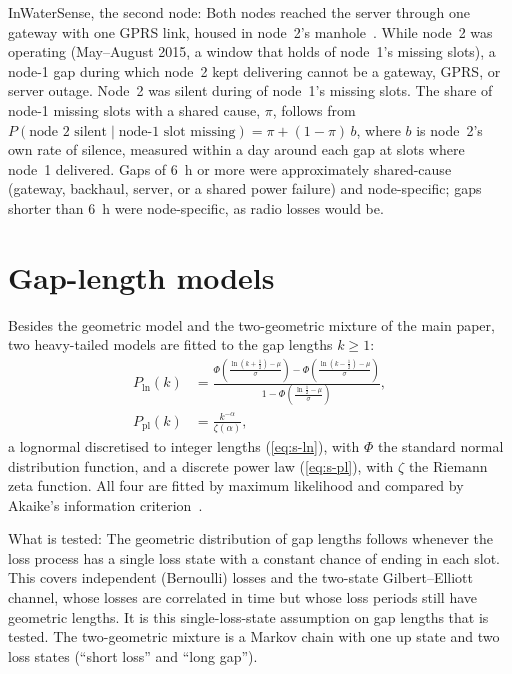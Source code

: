 \documentclass[journal]{IEEEtran}
\begin{document}
InWaterSense, the second node: Both nodes reached the server through one gateway with one GPRS link, housed in node~2's manhole~\cite{ahmedi2022dataset}. While node~2 was operating (May--August 2015, a window that holds \inwsWindowShare{} of node~1's missing slots), a node-1 gap during which node~2 kept delivering cannot be a gateway, GPRS, or server outage. Node~2 was silent during \inwsNodeTwoSilent{} of node~1's missing slots. The share of node-1 missing slots with a shared cause, $\pi$, follows from $P(\text{node 2 silent}\mid\text{node-1 slot missing})=\pi+(1-\pi)\,b$, where $b$ is node~2's own rate of silence, measured within a day around each gap at slots where node~1 delivered. Gaps of 6~h or more were approximately \inwsSharedLong{} shared-cause (gateway, backhaul, server, or a shared power failure) and \inwsSpecificLong{} node-specific; gaps shorter than 6~h were \inwsSpecificShort{} node-specific, as radio losses would be.

\section{Gap-length models}
\label{sec:s-models}
Besides the geometric model and the two-geometric mixture of the main paper, two heavy-tailed models are fitted to the gap lengths $k\ge1$:
\begin{align}
P_\mathrm{ln}(k)&=\frac{\Phi\!\left(\frac{\ln(k+\frac12)-\mu}{\sigma}\right)-\Phi\!\left(\frac{\ln(k-\frac12)-\mu}{\sigma}\right)}{1-\Phi\!\left(\frac{\ln\frac12-\mu}{\sigma}\right)}, \label{eq:s-ln}\\
P_\mathrm{pl}(k)&=\frac{k^{-\alpha}}{\zeta(\alpha)}, \label{eq:s-pl}
\end{align}
a lognormal discretised to integer lengths (\ref{eq:s-ln}), with $\Phi$ the standard normal distribution function, and a discrete power law (\ref{eq:s-pl}), with $\zeta$ the Riemann zeta function. All four are fitted by maximum likelihood and compared by Akaike's information criterion~\cite{akaike1974aic}.

What is tested: The geometric distribution of gap lengths follows whenever the loss process has a single loss state with a constant chance of ending in each slot. This covers independent (Bernoulli) losses and the two-state Gilbert--Elliott channel, whose losses are correlated in time but whose loss periods still have geometric lengths. It is this single-loss-state assumption on gap lengths that is tested. The two-geometric mixture is a Markov chain with one up state and two loss states (``short loss'' and ``long gap'').
\end{document}
